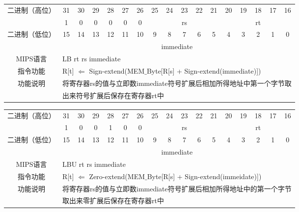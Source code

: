 \begin{table}
\begin{tabular}{|c|c|c|c|c|c|c|c|c|c|c|c|c|c|c|c|c|}
\hline
\multirow{2}{*}{二进制（高位）} &
31&30&29&28&27&26&25&24&23&22&21&20&19&18&17&16\\
\cline{2-17}
&
1&0&0&0&0&
0&
\multicolumn{5}{c|}{rs}&
\multicolumn{5}{c|}{rt}\\
\hline
\multirow{2}{*}{二进制（低位）} &
15&14&13&12&11&10&9&8&7&6&5&4&3&2&1&0\\
\cline{2-17}
&
\multicolumn{16}{c|}{immediate}\\
\hline
MIPS语言&
\multicolumn{16}{l|}{LB rt rs immediate}\\
\hline
指令功能&
\multicolumn{16}{l|}{R[t] $\Leftarrow$ Sign-extend(MEM$\_$Byte[R[s] + Sign-extend(immediate)])}\\
\hline
\multirow{2}{*}{功能说明}&
\multicolumn{16}{l|}{将寄存器rs的值与立即数immediate符号扩展后相加所得地址中第一个字节取}\\
&\multicolumn{16}{l|}{出来符号扩展后保存在寄存器rt中}\\
\hline
\end{tabular}
\end{table}

\begin{table}
\begin{tabular}{|c|c|c|c|c|c|c|c|c|c|c|c|c|c|c|c|c|}
\hline
\multirow{2}{*}{二进制（高位）} &
31&30&29&28&27&26&25&24&23&22&21&20&19&18&17&16\\
\cline{2-17}
&
1&0&0&1&0&
0&
\multicolumn{5}{c|}{rs}&
\multicolumn{5}{c|}{rt}\\
\hline
\multirow{2}{*}{二进制（低位）} &
15&14&13&12&11&10&9&8&7&6&5&4&3&2&1&0\\
\cline{2-17}
&
\multicolumn{16}{c|}{immediate}\\
\hline
MIPS语言&
\multicolumn{16}{l|}{LBU rt rs immediate}\\
\hline
指令功能&
\multicolumn{16}{l|}{R[t] $\Leftarrow$ Zero-extend(MEM$\_$Byte[R[s] + Sign-extend(immeidate)])}\\
\hline
\multirow{2}{*}{功能说明}&
\multicolumn{16}{l|}{将寄存器rs的值与立即数immediate符号扩展后相加所得地址中的第一个字节}\\
&\multicolumn{16}{l|}{取出来零扩展后保存在寄存器rt中}\\
\hline
\end{tabular}
\end{table}

